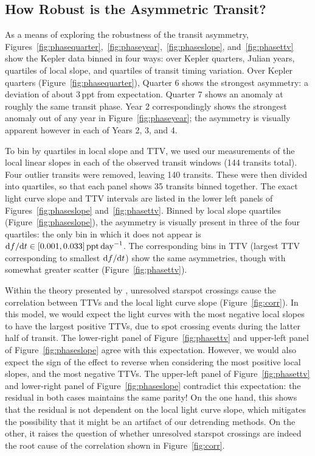 \documentclass[12pt,modern,twocolumn,tighten]{aastex63}
\begin{document}
\subsection{How Robust is the Asymmetric Transit?}

As a means of exploring the robustness of the transit asymmetry,
Figures~\ref{fig:phasequarter},~\ref{fig:phaseyear},~\ref{fig:phaseslope},
and~\ref{fig:phasettv} show the Kepler data binned in four ways: over
Kepler quarters, Julian years, quartiles of local slope, and quartiles
of transit timing variation.  Over Kepler quarters
(Figure~\ref{fig:phasequarter}), Quarter 6 shows the strongest
asymmetry: a deviation of about 3\,ppt from expectation.  Quarter 7
shows an anomaly at roughly the same transit phase.  Year 2
correspondingly shows the strongest anomaly out of any year in
Figure~\ref{fig:phaseyear}; the asymmetry is visually apparent however
in each of Years 2, 3, and 4.

To bin by quartiles in local slope and TTV, we used our measurements
of the local linear slopes in each of the observed transit windows
(144 transits total).  Four outlier transits were removed, leaving 140
transits.  These were then divided into quartiles, so that each panel
shows 35 transits binned together.  The exact light curve slope and
TTV intervals are listed in the lower left panels of
Figures~\ref{fig:phaseslope} and~\ref{fig:phasettv}.  Binned by local
slope quartiles (Figure~\ref{fig:phaseslope}), the asymmetry is
visually present in three of the four quartiles: the only bin in which
it does not appear is ${\rm d}f/{\rm d}t\in[0.001,0.033]\,{\rm
ppt\,day}^{-1}$.  The corresponding bins in TTV (largest TTV
corresponding to smallest ${\rm d}f/{\rm d}t$) show the same
asymmetries, though with somewhat greater scatter
(Figure~\ref{fig:phasettv}).

Within the theory presented by \citet{mazeh_time_2015}, unresolved
starspot crossings cause the correlation between TTVs and the local
light curve slope (Figure~\ref{fig:corr}).  In this model, we would
expect the light curves with the most negative local slopes to have
the largest positive TTVs, due to spot crossing events during the
latter half of transit.  The lower-right panel of
Figure~\ref{fig:phasettv} and upper-left panel of
Figure~\ref{fig:phaseslope} agree with this expectation.  However, we
would also expect the sign of the effect to reverse when considering
the most positive local slopes, and the most negative TTVs.  The
upper-left panel of Figure~\ref{fig:phasettv} and lower-right panel of
Figure~\ref{fig:phaseslope} contradict this expectation: the residual
in both cases maintains the same parity!  On the one hand, this shows
that the residual is not dependent on the local light curve slope,
which mitigates the possibility that it might be an artifact of our
detrending methods.  On the other, it raises the question of whether
unresolved starspot crossings are indeed the root cause of the
correlation shown in Figure~\ref{fig:corr}.
\end{document}
